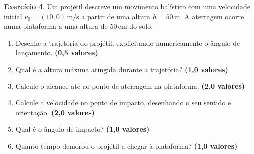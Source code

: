 \documentclass[12pt]{article}
\newcommand{\pontos}[1]{\hfill\textbf{(#1 valores)}}
\begin{document}
	\vspace{0.4cm}
	
	\textbf{Exercício 4}. Um projétil descreve um movimento balístico com uma velocidade inicial $\overline{v}_0 = (10, 0)\,\text{m/s}$ a partir de uma altura $h = 50\,\text{m}$. A aterragem ocorre numa plataforma a uma altura de $50\,\text{cm}$ do solo.
	\begin{enumerate}[label=\alph*)]
		\item Desenhe a trajetória do projétil, explicitando numericamente o ângulo de lançamento. \pontos{0,5}
		\item Qual é a altura máxima atingida durante a trajetória? \pontos{1,0}
		\item Calcule o alcance até ao ponto de aterragem na plataforma. \pontos{2,0}
		\item Calcule a velocidade no ponto de impacto, desenhando o seu sentido e orientação. \pontos{2,0}
		\item Qual é o ângulo de impacto? \pontos{1,0}
		\item Quanto tempo demorou o projétil a chegar à plataforma? \pontos{1,0}
	\end{enumerate}
	


	
\end{document}
